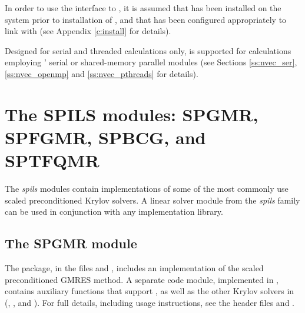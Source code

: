 In order to use 
the {\sundials} interface to {\superlumt}, it is assumed that {\superlumt}
has been installed on the system prior to installation of {\sundials}, and
that {\sundials} has been configured appropriately to link with
{\superlumt} (see Appendix \ref{c:install} for details).

Designed for serial and threaded calculations only, {\superlumt} is
supported for calculations employing {\sundials}' serial or shared-memory
parallel {\nvector} modules (see Sections \ref{ss:nvec_ser}, \ref{ss:nvec_openmp}
and \ref{ss:nvec_pthreads} for details).


\section{The SPILS modules: SPGMR, SPFGMR, SPBCG, and SPTFQMR}\label{s:spils}

The {\em spils} modules contain implementations of some of the most commonly
use scaled preconditioned Krylov solvers.
A linear solver module from the {\em spils} family can be used 
in conjunction with any {\nvector} implementation library.

\subsection{The SPGMR module}\label{ss:spgmr}

The {\spgmr} package, in the files  and
, includes an implementation of the scaled
preconditioned GMRES method.  A separate code
module, implemented in , contains
auxiliary functions that support {\spgmr}, as well as the other Krylov
solvers in {\sundials} ({\spfgmr}, {\spbcg}, and {\sptfqmr}).
For full details, including usage instructions, see the header
files  and .

